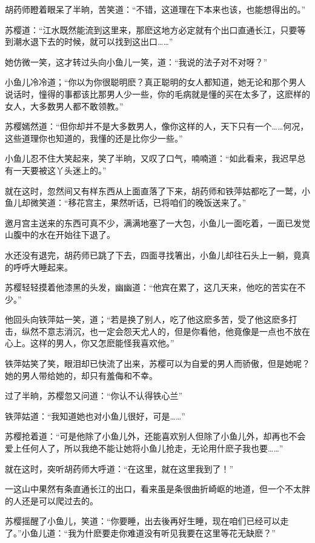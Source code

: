 \documentclass[12pt,oneside]{book}
\begin{document}
胡药师瞪着眼呆了半晌，苦笑道：``不错，这道理在下本来也该，也能想得出的。''

苏樱道：``江水既然能流到这里来，那麽这地方必定就有个出口直通长江，只要等到潮水退下去的时候，就可以找到这出口\ldots\ldots{}''

她仿微一笑，这才转过头向小鱼儿一笑，道：``我说的法子对不对呀？''

小鱼儿冷冷道；``你以为你很聪明麽？真正聪明的女人都知道，她无论和那个男人说话时，憧得的事都该比那男人少一些，你的毛病就是懂的买在太多了，这麽样的女人，大多数男人都不敢领教。''

苏樱嫣然道：``但你却并不是大多数男人，像你这样的人，天下只有一个\ldots\ldots 何况，这些道理你也知道的，我懂的还是比你少一些。''

小鱼儿忍不住大笑起来，笑了半晌，又叹了口气，喃喃道：``如此看来，我迟早总有一天要被这丫头迷上的。''

就在这时，忽然间又有样东西从上面直落了下来，胡药师和铁萍姑都吃了一鹫，小鱼儿却微笑道：``移花宫主，果然听话，已将咱们的晚饭送来了。''

邀月宫主送来的东西可真不少，满满地塞了一大包，小鱼儿一面吃着，一面已发觉山腹中的水在开始往下退了。

水还没有退完，胡药师已跳了下去，四面寻找箸出，小鱼儿却往石头上一躺，竟真的呼呼大睡起来。

苏樱轻轻摸着他漆黑的头发，幽幽道：``他宾在累了，这几天来，他吃的苦实在不少。''

他回头向铁萍姑一笑，道；``若是换了别人，吃了他这麽多苦，受了他这麽多打击，纵然不意志消沉，也一定会怨天尤人的，但是你看他，他竟像是一点也不放在心上。这样的男人，你又怎麽能怪我喜欢他。''

铁萍姑笑了笑，眼泪却已快流了出来，苏樱可以为自爱的男人而骄傲，但是她呢？她的男人带给她的，却只有羞侮和不幸。

过了半晌，苏樱忽又问道：``你认不认得铁心兰''

铁萍姑道：``我知道她也对小鱼儿很好，可是\ldots\ldots{}''

苏樱抢着道：``可是他除了小鱼儿外，还能喜欢别人但除了小鱼儿外，却再也不会爱上任何人了，所以我绝不能让她将小鱼儿抢走，无论用什麽子我也要\ldots\ldots{}''

就在这时，突听胡药师大呼道：``在这里，就在这里我到了！''

一这山中果然有条直通长江的出口，看来虽是条很曲折崎岖的地道，但一个不太胖的人还是可以爬过去的。

苏樱摇醒了小鱼儿，笑道：``你要睡，出去後再好生睡，现在咱们已经可以走了。''小鱼儿道：``我为什麽要走你难道没有听见我要在这里等花无缺麽？''
\end{document}
